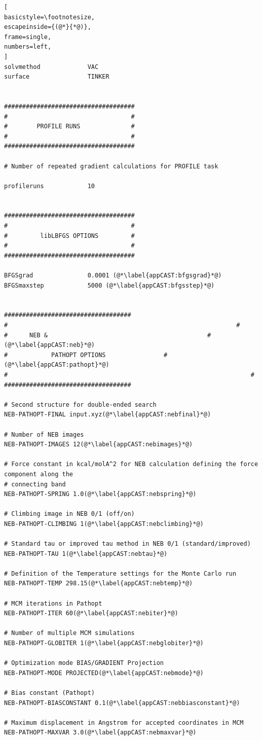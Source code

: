 \documentclass[a4paper,11pt]{scrartcl}
\begin{document}
\begin{lstlisting}[
basicstyle=\footnotesize,
escapeinside={(@*}{*@)},
frame=single,
numbers=left,
]
solvmethod             VAC
surface                TINKER


#################################### 
#                                  #
#        PROFILE RUNS              #
#                                  #
####################################

# Number of repeated gradient calculations for PROFILE task

profileruns            10


####################################
#                                  #
#         libLBFGS OPTIONS         #
#                                  #
####################################

BFGSgrad               0.0001 (@*\label{appCAST:bfgsgrad}*@)
BFGSmaxstep            5000 (@*\label{appCAST:bfgsstep}*@)


###################################
#				  												#
#      NEB & 											#(@*\label{appCAST:neb}*@)
#			 PATHOPT OPTIONS      			#(@*\label{appCAST:pathopt}*@)
#				 													#
###################################

# Second structure for double-ended search
NEB-PATHOPT-FINAL input.xyz(@*\label{appCAST:nebfinal}*@)

# Number of NEB images
NEB-PATHOPT-IMAGES 12(@*\label{appCAST:nebimages}*@)

# Force constant in kcal/molA^2 for NEB calculation defining the force component along the
# connecting band
NEB-PATHOPT-SPRING 1.0(@*\label{appCAST:nebspring}*@)

# Climbing image in NEB 0/1 (off/on)
NEB-PATHOPT-CLIMBING 1(@*\label{appCAST:nebclimbing}*@)

# Standard tau or improved tau method in NEB 0/1 (standard/improved)
NEB-PATHOPT-TAU 1(@*\label{appCAST:nebtau}*@)

# Definition of the Temperature settings for the Monte Carlo run
NEB-PATHOPT-TEMP 298.15(@*\label{appCAST:nebtemp}*@)

# MCM iterations in Pathopt
NEB-PATHOPT-ITER 60(@*\label{appCAST:nebiter}*@)

# Number of multiple MCM simulations
NEB-PATHOPT-GLOBITER 1(@*\label{appCAST:nebglobiter}*@)

# Optimization mode BIAS/GRADIENT Projection
NEB-PATHOPT-MODE PROJECTED(@*\label{appCAST:nebmode}*@)

# Bias constant (Pathopt)
NEB-PATHOPT-BIASCONSTANT 0.1(@*\label{appCAST:nebbiasconstant}*@)

# Maximum displacement in Angstrom for accepted coordinates in MCM 
NEB-PATHOPT-MAXVAR 3.0(@*\label{appCAST:nebmaxvar}*@)


\end{lstlisting}
\end{document}

